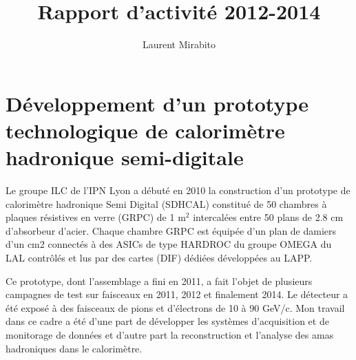 \documentclass[9pt,french]{article}
\title{\textbf{Rapport d'activit\'e 2012-2014}}
\author{Laurent Mirabito}
\date{}
\begin{document}
\maketitle

\section*{D\'eveloppement d'un prototype technologique de calorim\`etre hadronique semi-digitale}

Le groupe ILC de l'IPN Lyon a d\'ebut\'e en 2010 la construction d'un prototype de
calorim\`etre hadronique Semi Digital (SDHCAL) constitu\'e de 50 chambres \`a plaques r\'esistives en verre (GRPC) de 1 m$^2$ intercal\'ees entre 50 plans de 2.8 cm d'absorbeur d'acier. 
Chaque chambre GRPC est \'equip\'ee d'un plan de damiers d'un cm2 connect\'es \`a des ASICs de type
HARDROC du groupe OMEGA du LAL contrôl\'es et lus par des cartes (DIF) d\'edi\'ees d\'evelopp\'ees au LAPP.

Ce prototype, dont l'assemblage a fini en 2011, a fait l'objet de plusieurs campagnes de test sur faisceaux en 2011, 2012 et finalement 2014. Le d\'etecteur a \'et\'e expos\'e à des faisceaux de pions et d'\'electrons de 10 \`a 90 GeV/c. Mon travail dans ce cadre a \'et\'e d'une part de d\'evelopper les syst\`emes d'acquisition et de monitorage de donn\'ees et d'autre part la reconstruction et l'analyse des amas hadroniques dans le calorim\`etre.
\end{document}
